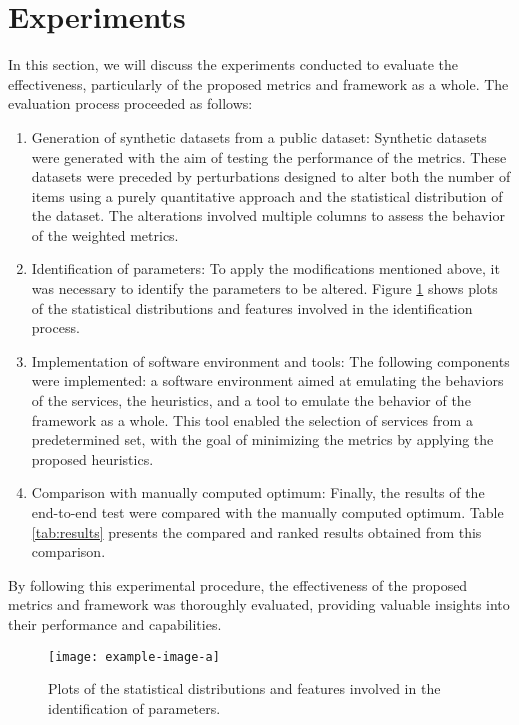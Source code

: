 \section{Experiments}\label{sec:experiment}
In this section, we will discuss the experiments conducted to evaluate the effectiveness, particularly of the proposed metrics and framework as a whole. The evaluation process proceeded as follows:

\begin{enumerate}
  \item Generation of synthetic datasets from a public dataset: Synthetic datasets were generated with the aim of testing the performance of the metrics. These datasets were preceded by perturbations designed to alter both the number of items using a purely quantitative approach and the statistical distribution of the dataset. The alterations involved multiple columns to assess the behavior of the weighted metrics.
  \item Identification of parameters: To apply the modifications mentioned above, it was necessary to identify the parameters to be altered. Figure \ref{fig:distributions} shows plots of the statistical distributions and features involved in the identification process.
  \item Implementation of software environment and tools: The following components were implemented: a software environment aimed at emulating the behaviors of the services, the heuristics, and a tool to emulate the behavior of the framework as a whole. This tool enabled the selection of services from a predetermined set, with the goal of minimizing the metrics by applying the proposed heuristics.
  \item Comparison with manually computed optimum: Finally, the results of the end-to-end test were compared with the manually computed optimum. Table \ref{tab:results} presents the compared and ranked results obtained from this comparison.
\end{enumerate}

By following this experimental procedure, the effectiveness of the proposed metrics and framework was thoroughly evaluated, providing valuable insights into their performance and capabilities.

\begin{figure}[ht]
  \centering
  \texttt{[image: example-image-a]}
  \caption{Plots of the statistical distributions and features involved in the identification of parameters.}
  \label{fig:distributions}
\end{figure}

